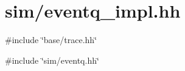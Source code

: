 \hypertarget{eventq__impl_8hh}{
\section{sim/eventq\_\-impl.hh}
\label{eventq__impl_8hh}
}
{\ttfamily \#include \char`\"{}base/trace.hh\char`\"{}}\par
{\ttfamily \#include \char`\"{}sim/eventq.hh\char`\"{}}\par

